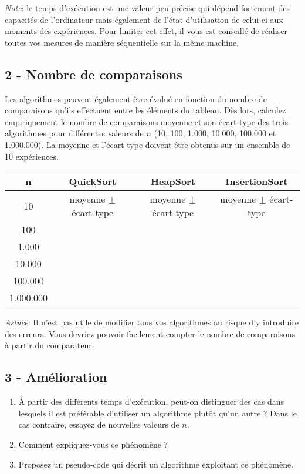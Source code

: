 \documentclass[a4paper,10pt]{article}
\begin{document}
{\em Note}: le temps d'exécution est une valeur peu précise qui dépend fortement des capacités de l'ordinateur mais également de l'état d'utilisation de celui-ci aux moments des expériences. Pour limiter cet effet, il vous est conseillé de réaliser toutes vos mesures de manière séquentielle sur la même machine.

\subsection*{2 - Nombre de comparaisons}
Les algorithmes peuvent également être évalué en fonction du nombre de comparaisons qu'ils effectuent entre les éléments du tableau. Dès lors, calculez empiriquement le nombre de comparaisons moyenne et son écart-type des trois algorithmes pour différentes valeurs de $n$ (10, 100, 1.000, 10.000, 100.000 et 1.000.000). La moyenne et l'écart-type doivent être obtenus sur un ensemble de 10 expériences.

\begin{center}
\begin{tabular}{cccc}
	\hline
	n & QuickSort & HeapSort & InsertionSort \\
	\hline
	10 & moyenne $\pm$ écart-type & moyenne $\pm$ écart-type & moyenne $\pm$ écart-type\\
	100 & & &\\
	1.000 & & &\\
	10.000 & & &\\
	100.000 & & &\\
	1.000.000 & & &\\
\end{tabular} 
\end{center}

{\em Astuce}: Il n'est pas utile de modifier tous vos algorithmes au risque d'y introduire des erreurs. Vous devriez pouvoir facilement compter le nombre de comparaisons à partir du comparateur.

\subsection*{3 - Amélioration}
\begin{enumerate}
\item À partir des différents temps d'exécution, peut-on distinguer des cas dans lesquels il est préférable d'utiliser un algorithme plutôt qu'un autre ? Dans le cas contraire, essayez de nouvelles valeurs de $n$.
\item Comment expliquez-vous ce phénomène ?
\item Proposez un pseudo-code qui décrit un algorithme exploitant ce phénomène.
\end{enumerate}
\end{document}
